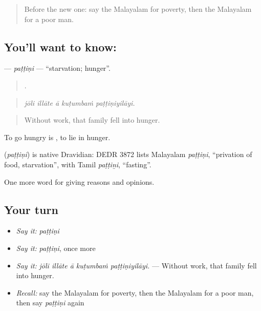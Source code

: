 \label{lesson:ML-C427-pattini}



\begin{quote}
Before the new one: say the Malayalam for poverty, then the Malayalam for a poor man.
\end{quote}

\subsection*{You'll want to know: }
\textbf{} — \emph{paṭṭiṇi} — \textquotedblleft{}starvation; hunger\textquotedblright{}.

\begin{quote}
    .
\end{quote}

\begin{quote}
\emph{jōli illāte ā kuṭumbaṁ paṭṭiṇiyilāyi.}
\end{quote}

\begin{quote}
Without work, that family fell into hunger.
\end{quote}

To go hungry is  , to lie in hunger.

\begin{cousinweb}
\textbf{} (\emph{paṭṭiṇi}) is native Dravidian: DEDR 3872 lists Malayalam \emph{paṭṭiṇi}, \textquotedblleft{}privation of food, starvation\textquotedblright{}, with Tamil \emph{paṭṭiṉi}, \textquotedblleft{}fasting\textquotedblright{}.
\end{cousinweb}

\begin{grammarlens}[title={What you've built}]
One more word for giving reasons and opinions.
\end{grammarlens}

\subsection*{Your turn}
\begin{itemize}
\raggedright
  \item \emph{Say it:} \emph{paṭṭiṇi}
  \item \emph{Say it:} \emph{paṭṭiṇi}, once more
  \item \emph{Say it:} \emph{jōli illāte ā kuṭumbaṁ paṭṭiṇiyilāyi.} — Without work, that family fell into hunger.
  \item \emph{Recall:} say the Malayalam for poverty, then the Malayalam for a poor man, then say \emph{paṭṭiṇi} again
\end{itemize}

